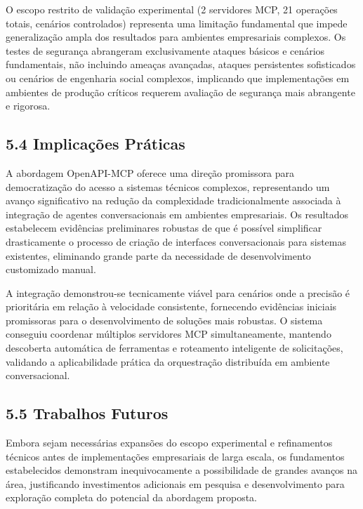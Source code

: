 \documentclass[
]{article}
\begin{document}
O escopo restrito de validação experimental (2 servidores MCP, 21
operações totais, cenários controlados) representa uma limitação
fundamental que impede generalização ampla dos resultados para ambientes
empresariais complexos. Os testes de segurança abrangeram exclusivamente
ataques básicos e cenários fundamentais, não incluindo ameaças
avançadas, ataques persistentes sofisticados ou cenários de engenharia
social complexos, implicando que implementações em ambientes de produção
críticos requerem avaliação de segurança mais abrangente e rigorosa.

\subsection{5.4 Implicações
Práticas}\label{implicauxe7uxf5es-pruxe1ticas}

A abordagem OpenAPI-MCP oferece uma direção promissora para
democratização do acesso a sistemas técnicos complexos, representando um
avanço significativo na redução da complexidade tradicionalmente
associada à integração de agentes conversacionais em ambientes
empresariais. Os resultados estabelecem evidências preliminares robustas
de que é possível simplificar drasticamente o processo de criação de
interfaces conversacionais para sistemas existentes, eliminando grande
parte da necessidade de desenvolvimento customizado manual.

A integração demonstrou-se tecnicamente viável para cenários onde a
precisão é prioritária em relação à velocidade consistente, fornecendo
evidências iniciais promissoras para o desenvolvimento de soluções mais
robustas. O sistema conseguiu coordenar múltiplos servidores MCP
simultaneamente, mantendo descoberta automática de ferramentas e
roteamento inteligente de solicitações, validando a aplicabilidade
prática da orquestração distribuída em ambiente conversacional.

\subsection{5.5 Trabalhos Futuros}\label{trabalhos-futuros}

Embora sejam necessárias expansões do escopo experimental e refinamentos
técnicos antes de implementações empresariais de larga escala, os
fundamentos estabelecidos demonstram inequivocamente a possibilidade de
grandes avanços na área, justificando investimentos adicionais em
pesquisa e desenvolvimento para exploração completa do potencial da
abordagem proposta.
\end{document}
